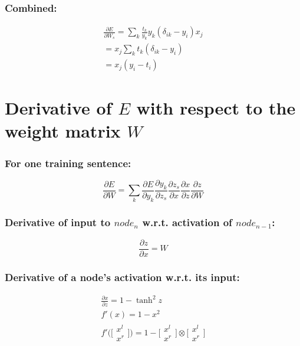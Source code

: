 \documentclass{article}
\begin{document}
	\subsubsection*{Combined:}
		\begin{equation}
			\begin{split}
				\frac{\partial E}{\partial W_s}
				= \sum\limits_{k}\frac{t_k}{y_k}y_{k}(\delta_{ik} - y_{i})x_j \\
			  = x_j \sum\limits_{k}{t_k (\delta_{ik}-y_i)} \\
			  = x_j(y_i - t_i)
			\end{split}
		\end{equation}
\section*{Derivative of $E$ with respect to the weight matrix $W$}
	\subsubsection*{For one training sentence:}
	\begin{equation}
		\frac{\partial E}{\partial W} = 
		\sum\limits_{k}\frac{\partial E}{\partial y_k}
		\frac{\partial y_k}{\partial z_{s}}
		\frac{\partial z_{s}}{\partial x}
		\frac{\partial x}{\partial z}
		\frac{\partial z}{\partial W}
	\end{equation}
	\subsubsection*{Derivative of input to $node_n$ w.r.t. activation of $node_{n-1}$:}
	\begin{equation}
		\frac{\partial z}{\partial x} = W
	\end{equation}
	\subsubsection*{Derivative of a node's activation w.r.t. its input:}
	\begin{equation}
		\begin{split}
			\frac{\partial x}{\partial z} = 1 - \tanh^2z \\
			f'(x) = 1 - x^2 \\
			f' \bigg( \bigg[ \begin{array}{c} x^l \\ x^r \end{array} \bigg] \bigg) = 
			1 - \bigg[ \begin{array}{c} x^l \\ x^r \end{array} \bigg] \otimes \bigg[ \begin{array}{c} x^l \\ x^r \end{array} \bigg]
		\end{split}
	\end{equation}
\end{document}
